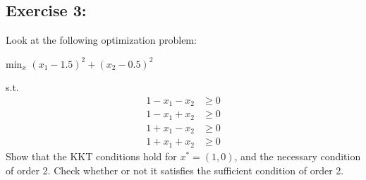 \documentclass{article}
\begin{document}
\subsection{Exercise 3:}
Look at the following optimization problem: 
\begin{center}
    $\text{min}_x$ $(x_1 - 1.5)^2 + (x_2 - 0.5)^2$
\end{center}
s.t. 
\begin{align*}
    1 -x_1 -x_2&\geq 0 \\
    1 -x_1 +x_2&\geq 0 \\
    1 +x_1 -x_2&\geq 0 \\
    1 +x_1 +x_2&\geq 0
\end{align*}
Show that the KKT conditions hold for $x^* = (1,0)$, and the necessary condition of order 2. Check whether or not it satisfies the sufficient condition of order 2. 
\end{document}
